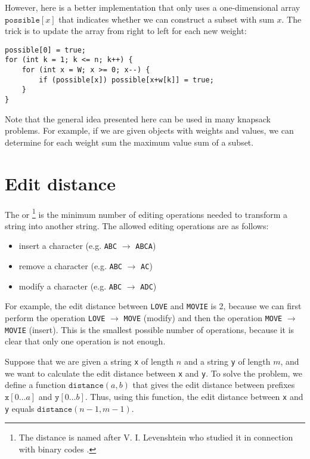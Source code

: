 However, here is a better implementation that only uses
a one-dimensional array $\texttt{possible}[x]$
that indicates whether we can construct a subset with sum $x$.
The trick is to update the array from right to left for
each new weight:
\begin{lstlisting}
possible[0] = true;
for (int k = 1; k <= n; k++) {
    for (int x = W; x >= 0; x--) {
        if (possible[x]) possible[x+w[k]] = true;
    }
}
\end{lstlisting}

Note that the general idea presented here can be used
in many knapsack problems.
For example, if we are given objects with weights and values,
we can determine for each weight sum the maximum value
sum of a subset.

\section{Edit distance}


The  or \footnote{The distance
is named after V. I. Levenshtein who studied it in connection with binary codes \cite{lev66}.}
is the minimum number of editing operations
needed to transform a string
into another string.
The allowed editing operations are as follows:
\begin{itemize}
\item insert a character (e.g. \texttt{ABC} $\rightarrow$ \texttt{ABCA})
\item remove a character (e.g. \texttt{ABC} $\rightarrow$ \texttt{AC})
\item modify a character (e.g. \texttt{ABC} $\rightarrow$ \texttt{ADC})
\end{itemize}

For example, the edit distance between
\texttt{LOVE} and \texttt{MOVIE} is 2,
because we can first perform the operation
 \texttt{LOVE} $\rightarrow$ \texttt{MOVE}
(modify) and then the operation
\texttt{MOVE} $\rightarrow$ \texttt{MOVIE}
(insert).
This is the smallest possible number of operations,
because it is clear that only one operation is not enough.

Suppose that we are given a string \texttt{x}
of length $n$ and a string \texttt{y} of length $m$,
and we want to calculate the edit distance between
\texttt{x} and \texttt{y}.
To solve the problem, we define a function
$\texttt{distance}(a,b)$ that gives the
edit distance between prefixes
$\texttt{x}[0 \ldots a]$ and $\texttt{y}[0 \ldots b]$.
Thus, using this function, the edit distance
between \texttt{x} and \texttt{y} equals $\texttt{distance}(n-1,m-1)$.

